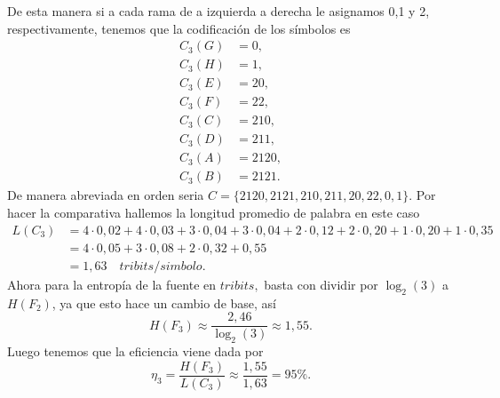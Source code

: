 \begin{sols}
\begin{center}
    \end{center}
De esta manera si a cada rama de a izquierda a derecha le asignamos 0,1 y 2, respectivamente, tenemos que la codificación de los símbolos es
\begin{align*}
    C_3(G)&=0,\\
    C_3(H)&=1,\\
    C_3(E)&=20,\\
    C_3(F)&=22,\\
    C_3(C)&=210,\\
    C_3(D)&=211,\\
    C_3(A)&=2120,\\
    C_3(B)&=2121.
\end{align*}
De manera abreviada en orden seria $C=\{2120,2121,210,211,20,22,0,1\}.$ Por hacer la comparativa hallemos la longitud promedio de palabra en este caso
\begin{align*}
    L(C_3)&=4\cdot0,02+4\cdot0,03+3\cdot0,04+3\cdot0,04+2\cdot0,12+2\cdot0,20+1\cdot0,20+1\cdot0,35\\
    &=4\cdot0,05+3\cdot0,08+2\cdot0,32+0,55\\
    &=1,63\quad tribits/simbolo.
\end{align*}
Ahora para la entropía de la fuente en $tribits,$ basta con dividir por $\log_2(3)$ a $H(F_2)$, ya que esto hace un cambio de base, así
$$H(F_3)\approx\frac{2,46}{\log_2(3)}\approx 1,55.$$
Luego tenemos que la eficiencia viene dada por
$$\eta_3=\frac{H(F_3)}{L(C_3)}\approx\frac{1,55}{1,63}=95\%.$$



\end{sols}